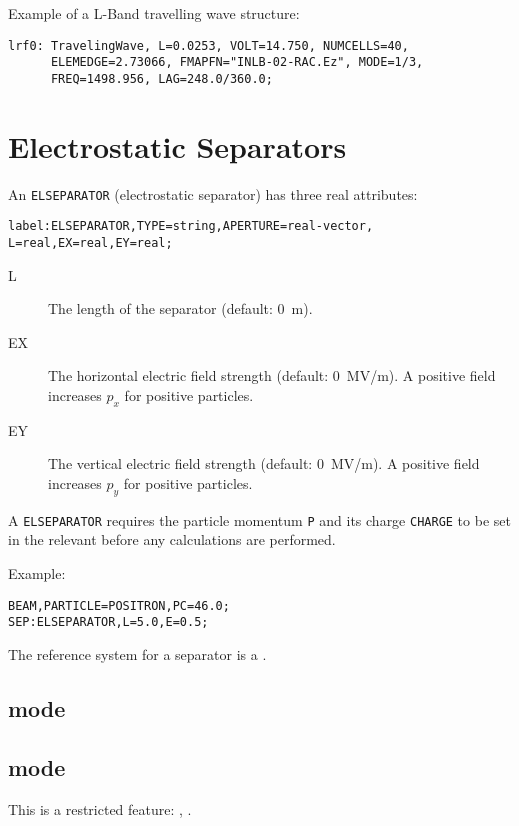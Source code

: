 \noindent Example of a L-Band travelling wave structure:
\begin{verbatim}
lrf0: TravelingWave, L=0.0253, VOLT=14.750, NUMCELLS=40, 
      ELEMEDGE=2.73066, FMAPFN="INLB-02-RAC.Ez", MODE=1/3, 
      FREQ=1498.956, LAG=248.0/360.0;
\end{verbatim}

\section{Electrostatic Separators}
\label{sec:separator}
An \texttt{ELSEPARATOR} (electrostatic separator) has three real
attributes:
\begin{verbatim}
label:ELSEPARATOR,TYPE=string,APERTURE=real-vector,
L=real,EX=real,EY=real;
\end{verbatim}
\begin{description}
\item[L]
  The length of the separator (default: 0~m).
\item[EX]
  The horizontal electric field strength (default: 0~MV/m).
  A positive field increases $p_x$ for positive particles.
\item[EY]
  The vertical electric field strength (default: 0~MV/m).
  A positive field increases $p_y$ for positive particles.
\end{description}
A \texttt{ELSEPARATOR} requires the particle momentum \texttt{P} 
and its charge \texttt{CHARGE} to be set in the relevant
 before any calculations are performed.

\noindent Example:
\begin{verbatim}
BEAM,PARTICLE=POSITRON,PC=46.0;
SEP:ELSEPARATOR,L=5.0,E=0.5;
\end{verbatim}
The reference system for a separator is a 
.
\subsection{\opalt mode}

\subsection{\opalcycl mode}

This is a restricted feature: \noopalt, \noopalcycl .

